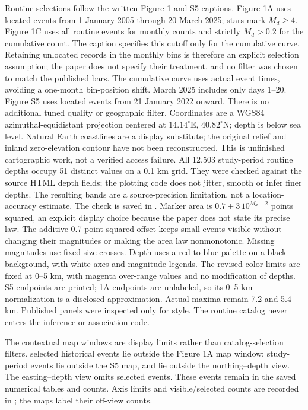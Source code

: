 Routine selections follow the written Figure 1 and S5 captions. Figure 1A uses located events from 1 January 2005 through 20 March 2025; stars mark $M_d\geq4$. Figure 1C uses all routine events for monthly counts and strictly $M_d>0.2$ for the cumulative count. The caption specifies this cutoff only for the cumulative curve. Retaining unlocated records in the monthly bins is therefore an explicit selection assumption; the paper does not specify their treatment, and no filter was chosen to match the published bars. The cumulative curve uses actual event times, avoiding a one-month bin-position shift. March 2025 includes only days 1--20. Figure S5 uses located events from 21 January 2022 onward. There is no additional tuned quality or geographic filter. Coordinates are a WGS84 azimuthal-equidistant projection centered at $14.14^\circ$E, $40.82^\circ$N; depth is below sea level. Natural Earth coastlines are a display substitute; the original relief and inland zero-elevation contour have not been reconstructed. This is unfinished cartographic work, not a verified access failure. All 12,503 study-period routine depths occupy 51 distinct values on a 0.1 km grid. They were checked against the source HTML depth fields; the plotting code does not jitter, smooth or infer finer depths. The resulting bands are a source-precision limitation, not a location-accuracy estimate. The check is saved in . Marker area is $0.7+3\,10^{M_d-2}$ points squared, an explicit display choice because the paper does not state its precise law. The additive 0.7 point-squared offset keeps small events visible without changing their magnitudes or making the area law nonmonotonic. Missing magnitudes use fixed-size crosses. Depth uses a red-to-blue palette on a black background, with white axes and magnitude legends. The revised color limits are fixed at 0--5 km, with magenta over-range values and no modification of depths. S5 endpoints are printed; 1A endpoints are unlabeled, so its 0--5 km normalization is a disclosed approximation. Actual maxima remain 7.2 and 5.4 km. Published panels were inspected only for style. The routine catalog never enters the inference or association code.

The contextual map windows are display limits rather than catalog-selection filters. \CurrentRoutineOffMap{} selected historical events lie outside the Figure 1A map window; \CurrentStudyOffMap{} study-period events lie outside the S5 map, and \CurrentStudyOffNorthDepth{} lie outside the northing--depth view. The easting--depth view omits \CurrentStudyOffEastDepth{} selected events. These events remain in the saved numerical tables and counts. Axis limits and visible/selected counts are recorded in ; the maps label their off-view counts.

